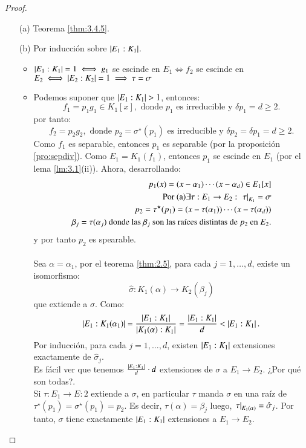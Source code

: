 \begin{proof}$ $
    \begin{itemize}
        \item[(a)] Teorema \ref{thm:3.4.5}.
        \item[(b)] Por inducción sobre $\left|E_1:K_1\right|$.
        \begin{itemize}
            \item $\left|E_1:K_1\right| = 1 \iff g_1$ se escinde en $E_1 \iff f_2$ se escinde en $E_2 \iff \left|E_2:K_2\right| = 1 \implies \tau = \sigma$
            \item Podemos suponer que $\left|E_1:K_1\right| > 1$, entonces:
            $$
                f_1 = p_1g_1 \in K_1[x], \text{ donde } p_1 \text{ es irreducible y } \delta p_1 = d \geq 2.
            $$
            por tanto:
            $$
                f_2 = p_2g_2, \text{ donde } p_2 = \sigma^\star(p_1) \text{ es irreducible y } \delta p_2 = \delta p_1 = d \geq 2.
            $$
            Como $f_1$ es separable, entonces $p_1$ es separable (por la proposición \ref{pro:sepdiv}). Como $E_1 = K_1(f_1)$, entonces $p_1$ se escinde en $E_1$ (por el lema \ref{lm:3.1}(ii)). Ahora, desarrollando:
            \begin{align*}
                p_1(x) = (x-\alpha_1) \cdots (x - \alpha_d) \in E_1[x]\\
                \text{Por (a)} \exists \tau:E_1 \to E_2 :\ \rest{\tau}_{K_1} = \sigma\\
                p_2 = \tau^\star(p_1) = (x - \tau(\alpha_1)) \cdots (x - \tau(\alpha_d))\\
                \beta_j = \tau(\alpha_j) \text{ donde las $\beta_j$ son las raíces distintas de } p_2 \text{ en } E_2.
            \end{align*}
            y por tanto $p_2$ es spearable.\\\\
            Sea $\alpha = \alpha_1$, por el teorema \ref{thm:2.5}, para cada $j = 1, \ldots, d$, existe un isomorfismo:
            $$
                \hat\sigma : K_1(\alpha) \to K_2(\beta_j)
            $$
            que extiende a $\sigma$. Como:
            $$
                \left|E_1:K_1(\alpha_1)\right| = \frac{\left|E_1:K_1\right|}{\left|K_1(\alpha):K_1\right|} = \frac{\left|E_1:K_1\right|}{d} < \left|E_1:K_1\right|.
            $$
            Por inducción, para cada $j = 1, \ldots, d$, existen $\left|E_1:K_1\right|$ extensiones exactamente de $\hat\sigma_j$.\\
            Es fácil ver que tenemos $\frac{\left|E_1:K_1\right|}{d} \cdot d$ extensiones de $\sigma$ a $E_1 \to E_2$. ¿Por qué son todas?.\\

            Si $\tau: E_1 \to E:2$ extiende a $\sigma$, en particular $\tau$ manda $\sigma$ en una raíz de $\tau^\star(p_1) = \sigma^\star(p_1) = p_2$. Es decir, $\tau(\alpha) = \beta_j$ luego, $\left.\tau\right|_{K_1(\alpha)} = \hat\sigma_j$.
            Por tanto, $\sigma$ tiene exactamente $\left|E_1:K_1\right|$ extensiones a $E_1 \to E_2$.
        \end{itemize}
    \end{itemize}
\end{proof}


